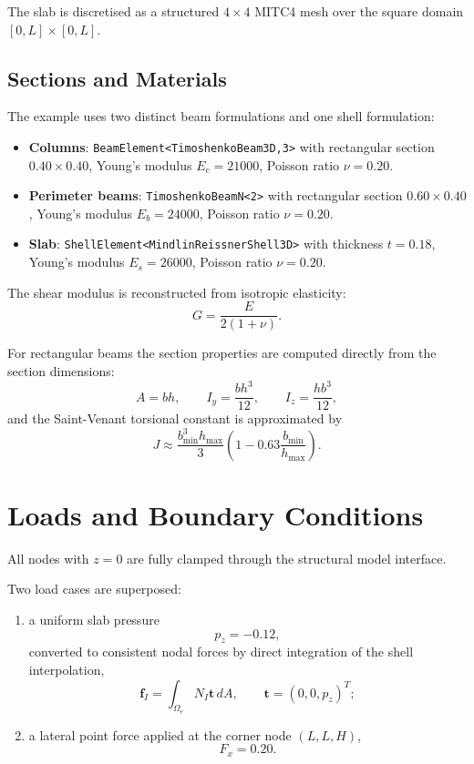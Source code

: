The slab is discretised as a structured \(4\times 4\) MITC4 mesh over the
square domain \([0,L]\times[0,L]\).

\subsection{Sections and Materials}

The example uses two distinct beam formulations and one shell formulation:
\begin{itemize}
  \item \textbf{Columns}: \texttt{BeamElement<TimoshenkoBeam3D,3>} with
        rectangular section \(0.40\times 0.40\), Young's modulus
        \(E_c = 21000\), Poisson ratio \(\nu = 0.20\).
  \item \textbf{Perimeter beams}: \texttt{TimoshenkoBeamN<2>} with
        rectangular section \(0.60\times 0.40\), Young's modulus
        \(E_b = 24000\), Poisson ratio \(\nu = 0.20\).
  \item \textbf{Slab}: \texttt{ShellElement<MindlinReissnerShell3D>} with
        thickness \(t = 0.18\), Young's modulus \(E_s = 26000\), Poisson ratio
        \(\nu = 0.20\).
\end{itemize}

The shear modulus is reconstructed from isotropic elasticity:
\[
G = \frac{E}{2(1+\nu)}.
\]

For rectangular beams the section properties are computed directly from the
section dimensions:
\[
A = b h,
\qquad
I_y = \frac{b h^3}{12},
\qquad
I_z = \frac{h b^3}{12},
\]
and the Saint-Venant torsional constant is approximated by
\[
J \approx \frac{b_\mathrm{min}^3 h_\mathrm{max}}{3}
\left(1 - 0.63 \frac{b_\mathrm{min}}{h_\mathrm{max}}\right).
\]

\section{Loads and Boundary Conditions}

All nodes with \(z=0\) are fully clamped through the structural model
interface.

Two load cases are superposed:
\begin{enumerate}
  \item a uniform slab pressure
        \[
        p_z = -0.12,
        \]
        converted to consistent nodal forces by direct integration of the shell
        interpolation,
        \[
        \mathbf{f}_I = \int_{\Omega_e} N_I \mathbf{t}\, dA,
        \qquad
        \mathbf{t} = (0,0,p_z)^T;
        \]
  \item a lateral point force applied at the corner node \((L,L,H)\),
        \[
        F_x = 0.20.
        \]
\end{enumerate}

